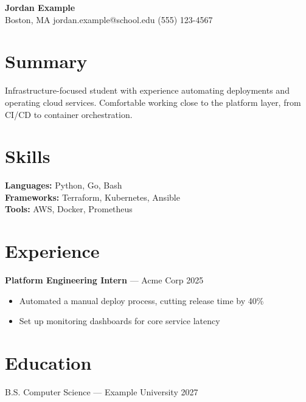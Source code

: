 \documentclass[11pt]{article}
\begin{document}
\begin{center}
{\LARGE \textbf{Jordan Example}} \\
Boston, MA \quad jordan.example@school.edu \quad (555) 123-4567
\end{center}

\section*{Summary}
Infrastructure-focused student with experience automating deployments and
operating cloud services. Comfortable working close to the platform layer,
from CI/CD to container orchestration.

\section*{Skills}
\textbf{Languages:} Python, Go, Bash \\
\textbf{Frameworks:} Terraform, Kubernetes, Ansible \\
\textbf{Tools:} AWS, Docker, Prometheus

\section*{Experience}
\textbf{Platform Engineering Intern} --- Acme Corp \hfill 2025 \\
\begin{itemize}[nosep]
  \item Automated a manual deploy process, cutting release time by 40\%
  \item Set up monitoring dashboards for core service latency
\end{itemize}

\section*{Education}
B.S. Computer Science --- Example University \hfill 2027
\end{document}
